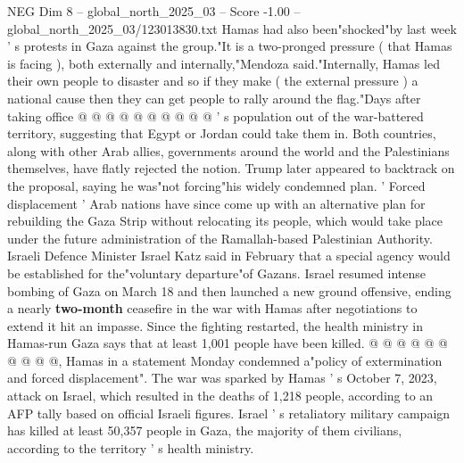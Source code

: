 \begin{textsample}{NEG Dim 8 – global\_north\_2025\_03 – Score -1.00 – global\_north\_2025\_03/123013830.txt}
Hamas had also been"shocked"by last week ' s protests in Gaza against the group."It is a two-pronged pressure ( that Hamas is facing ), both externally and internally,"Mendoza said."Internally, Hamas led their own people to disaster and so if they make ( the external pressure ) a national cause then they can get people to rally around the flag."Days after taking office @ @ @ @ @ @ @ @ @ @ ' s population out of the war-battered territory, suggesting that Egypt or Jordan could take them in.
Both countries, along with other Arab allies, governments around the world and the Palestinians themselves, have flatly rejected the notion.
Trump later appeared to backtrack on the proposal, saying he was"not forcing"his widely condemned plan. ' Forced displacement ' Arab nations have since come up with an alternative plan for rebuilding the Gaza Strip without relocating its people, which would take place under the future administration of the Ramallah-based Palestinian Authority.
Israeli Defence Minister Israel Katz said in February that a special agency would be established for the"voluntary departure"of Gazans.
Israel resumed intense bombing of Gaza on March 18 and then launched a new ground offensive, ending a nearly \textbf{two-month} ceasefire in the war with Hamas after negotiations to extend it hit an impasse.
Since the fighting restarted, the health ministry in Hamas-run Gaza says that at least 1,001 people have been killed. @ @ @ @ @ @ @ @ @ @, Hamas in a statement Monday condemned a"policy of extermination and forced displacement".
The war was sparked by Hamas ' s October 7, 2023, attack on Israel, which resulted in the deaths of 1,218 people, according to an AFP tally based on official Israeli figures.
Israel ' s retaliatory military campaign has killed at least 50,357 people in Gaza, the majority of them civilians, according to the territory ' s health ministry.

\end{textsample}
